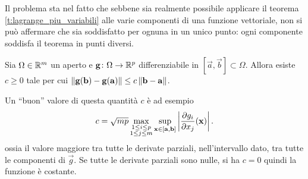 Il problema sta nel fatto che sebbene sia realmente possibile applicare il teorema \ref{t:lagrange_piu_variabili} alle varie componenti di una funzione vettoriale, non si può affermare che sia soddisfatto per ognuna in un unico punto: ogni componente soddisfa il teorema in punti diversi.
\begin{teorema}
Sia $\Omega\in\mathbb{R}^m$ un aperto e $\mathbf{g}\colon\Omega\to\mathbb{R}^p$ differenziabile in $[\vec a,\vec b]\subset\Omega$. Allora esiste $c\geq 0$ tale per cui $\left\|{\mathbf{g}(\mathbf{b})-\mathbf{g}(\mathbf{a})}\right\|\leq c\left\|{\mathbf{b}-\mathbf{a}}\right\|$.
\end{teorema}
Un ``buon'' valore di questa quantità $c$ è ad esempio
\begin{equation*}
	c=\sqrt{mp}\max_{\substack{1\leq i\leq p\\1\leq j\leq m}}\sup_{\mathbf{x}\in[\mathbf{a},\mathbf{b}]}\left|{\frac{\partial {g_i}}{\partial {x_j}}(\mathbf{x})}\right|.
\end{equation*}
ossia il valore maggiore tra tutte le derivate parziali, nell'intervallo dato, tra tutte le componenti di $\vec g$.
Se tutte le derivate parziali sono nulle, si ha $c=0$ quindi la funzione è costante.

